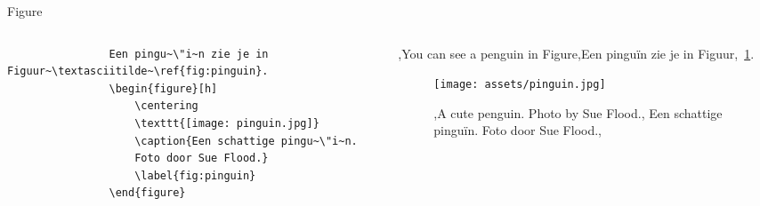 \begin{frame}[fragile]{Figure}
    \begin{columns}
        \begin{column}{0.6\textwidth}
            \begin{verbatim}
                Een pingu~\"i~n zie je in Figuur~\textasciitilde~\ref{fig:pinguin}.
                \begin{figure}[h]
                    \centering
                    \texttt{[image: pinguin.jpg]}
                    \caption{Een schattige pingu~\"i~n.
                    Foto door Sue Flood.}
                    \label{fig:pinguin}
                \end{figure}
            \end{verbatim}
        \end{column}
        \begin{column}{0.4\textwidth}
            \lang,You can see a penguin in Figure,Een pinguïn zie je in Figuur,~\ref{fig:pinguin}.
            \begin{figure}[h]
                \centering
                \texttt{[image: assets/pinguin.jpg]}
                \caption{\lang,A cute penguin. Photo by Sue Flood.,%
                Een schattige pinguïn. Foto door Sue Flood.,}\label{fig:pinguin}
            \end{figure}
        \end{column}
    \end{columns}
\end{frame}
